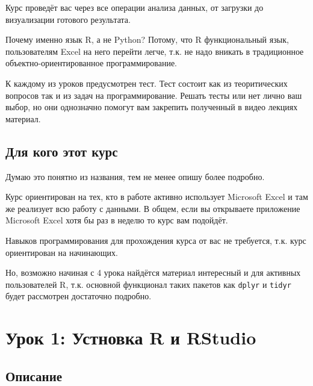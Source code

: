 \documentclass[
]{book}
\begin{document}
Курс проведёт вас через все операции анализа данных, от загрузки до визуализации готового результата.

Почему именно язык R, а не Python? Потому, что R функциональный язык, пользователям Excel на него перейти легче, т.к. не надо вникать в традиционное объектно-ориентированное программирование.

К каждому из уроков предусмотрен тест. Тест состоит как из теоритических вопросов так и из задач на программирование. Решать тесты или нет лично ваш выбор, но они однозначно помогут вам закрепить полученный в видео лекциях материал.

\hypertarget{ux434ux43bux44f-ux43aux43eux433ux43e-ux44dux442ux43eux442-ux43aux443ux440ux441}{%
\section*{Для кого этот курс}\label{ux434ux43bux44f-ux43aux43eux433ux43e-ux44dux442ux43eux442-ux43aux443ux440ux441}}

Думаю это понятно из названия, тем не менее опишу более подробно.

Курс ориентирован на тех, кто в работе активно использует Microsoft Excel и там же реализует всю работу с данными. В общем, если вы открываете приложение Microsoft Excel хотя бы раз в неделю то курс вам подойдёт.

Навыков программирования для прохождения курса от вас не требуется, т.к. курс ориентирован на начинающих.

Но, возможно начиная с 4 урока найдётся материал интересный и для активных пользователей R, т.к. основной функционал таких пакетов как \texttt{dplyr} и \texttt{tidyr} будет рассмотрен достаточно подробно.

\hypertarget{ux443ux440ux43eux43a-1-ux443ux441ux442ux43dux43eux432ux43aux430-r-ux438-rstudio}{%
\chapter{Урок 1: Устновка R и RStudio}\label{ux443ux440ux43eux43a-1-ux443ux441ux442ux43dux43eux432ux43aux430-r-ux438-rstudio}}

\hypertarget{ux43eux43fux438ux441ux430ux43dux438ux435}{%
\section{Описание}\label{ux43eux43fux438ux441ux430ux43dux438ux435}}
\end{document}
